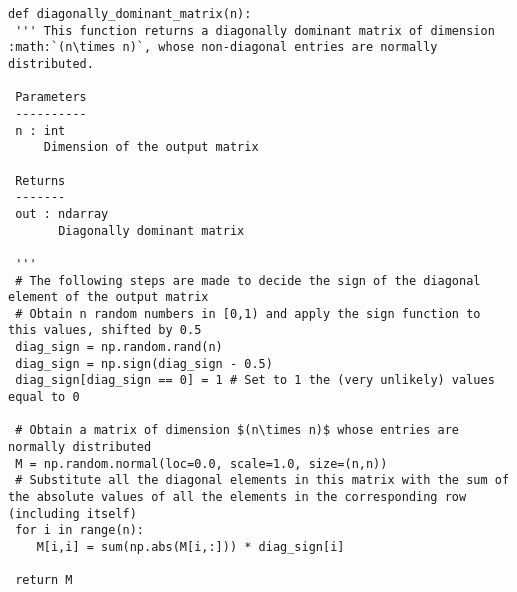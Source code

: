 \documentclass[a4paper,11pt]{article}
\begin{document}
\begin{verbatim}
def diagonally_dominant_matrix(n):
 ''' This function returns a diagonally dominant matrix of dimension :math:`(n\times n)`, whose non-diagonal entries are normally distributed.

 Parameters
 ----------
 n : int
     Dimension of the output matrix

 Returns
 -------
 out : ndarray
       Diagonally dominant matrix

 '''
 # The following steps are made to decide the sign of the diagonal element of the output matrix
 # Obtain n random numbers in [0,1) and apply the sign function to this values, shifted by 0.5
 diag_sign = np.random.rand(n)
 diag_sign = np.sign(diag_sign - 0.5)
 diag_sign[diag_sign == 0] = 1 # Set to 1 the (very unlikely) values equal to 0

 # Obtain a matrix of dimension $(n\times n)$ whose entries are normally distributed
 M = np.random.normal(loc=0.0, scale=1.0, size=(n,n))
 # Substitute all the diagonal elements in this matrix with the sum of the absolute values of all the elements in the corresponding row (including itself)
 for i in range(n):
    M[i,i] = sum(np.abs(M[i,:])) * diag_sign[i]

 return M
\end{verbatim}
\end{document}
